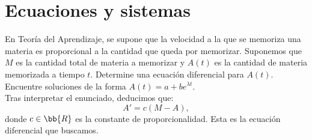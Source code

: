 \section{Ecuaciones y sistemas}

\begin{ejercicio}
    En Teoría del Aprendizaje, se supone que la velocidad a la que se memoriza una materia es proporcional a la
    cantidad que queda por memorizar. Suponemos que \(M\) es la cantidad total de materia a memorizar y \(A(t)\) es la
    cantidad de materia memorizada a tiempo \(t\). Determine una ecuación diferencial para \(A(t)\). Encuentre soluciones
    de la forma \(A(t) = a + be^{\lambda t}\).\\

    Tras interpretar el enunciado, deducimos que:
    \begin{equation*}
        A' = c(M - A),
    \end{equation*}
    donde $c\in \bb{R}$ es la constante de proporcionalidad. Esta es la ecuación diferencial que buscamos.

\end{ejercicio}


